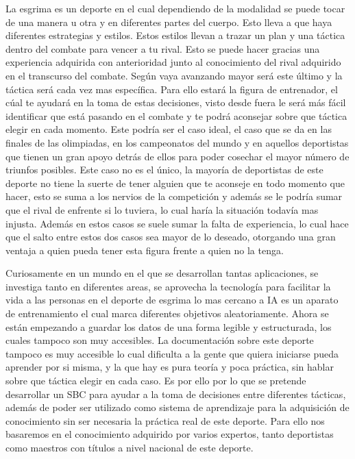 \documentclass[11pt,a4paper,twoside,final]{article}
\begin{document}
\newpage
La esgrima es un deporte en el cual dependiendo de la modalidad se puede tocar de una manera u otra y en diferentes partes del cuerpo. Esto lleva a que haya diferentes estrategias
 y estilos. Estos estilos llevan a trazar un plan y una táctica dentro del combate para vencer a tu rival. Esto se puede hacer gracias una experiencia adquirida con anterioridad
 junto al conocimiento del rival adquirido en el transcurso del combate. Según vaya avanzando mayor será este último y la táctica será cada vez mas específica. Para ello
 estará la figura de entrenador, el cúal te ayudará en la toma de estas decisiones, visto desde fuera le será más fácil identificar que está pasando en el combate y te podrá
 aconsejar sobre que táctica elegir en cada momento. Este podría ser el caso ideal, el caso que se da en las finales de las olimpiadas, en los campeonatos del mundo y en aquellos
 deportistas que tienen un gran apoyo detrás de ellos para poder cosechar el mayor número de triunfos posibles. Este caso no es el único, la mayoría de deportistas de este deporte
 no tiene la suerte de tener alguien que te aconseje en todo momento que hacer, esto se suma a los nervios de la competición y además se le podría sumar que el rival de enfrente
 si lo tuviera, lo cual haría la situación todavía mas injusta. Además en estos casos se suele sumar la falta de experiencia, lo cual hace que el salto entre estos dos casos sea
 mayor de lo deseado, otorgando una gran ventaja a quien pueda tener esta figura frente a quien no la tenga.

\smallskip
Curiosamente en un mundo en el que se desarrollan tantas aplicaciones, se investiga tanto en diferentes areas, se aprovecha la tecnología para facilitar la vida a las personas
 en el deporte de esgrima lo mas cercano a IA es un aparato de entrenamiento el cual marca diferentes objetivos aleatoriamente. Ahora se están empezando a guardar los datos de
 una forma legible y estructurada, los cuales tampoco son muy accesibles. La documentación sobre este deporte tampoco es muy accesible lo cual dificulta a la gente
 que quiera iniciarse pueda aprender por si misma, y la que hay es pura teoría y poca práctica, sin hablar sobre que táctica elegir en cada caso. Es por ello por lo que se pretende
 desarrollar un SBC para ayudar a la toma de decisiones entre diferentes tácticas, además de poder ser utilizado como sistema de aprendizaje para la adquisición de conocimiento
 sin ser necesaria la práctica real de este deporte. Para ello nos basaremos en el conocimiento adquirido por varios expertos, tanto deportistas como maestros con títulos a nivel
 nacional de este deporte.
\end{document}
